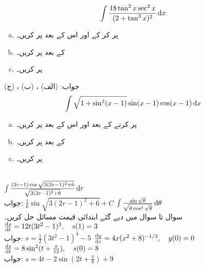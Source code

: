 \begin{align*}
\int\frac{18\tan^2x\sec^2x}{(2+\tan^3x)^2}\dif x
\end{align*}
\begin{enumerate}[a.]
\item
{} پر کر کے   اور اس کے بعد  پر کریں۔
\item
{} کے بعد  پر کریں۔
\item
{} پر کریں۔
\end{enumerate}
جواب:\quad
(الف) ، (ب) ، (ج) 
\begin{align*}
\int\sqrt{1+\sin^2(x-1)}\sin(x-1)\cos(x-1)\dif x
\end{align*}
\begin{enumerate}[a.]
\item
{} پر کرنے کے بعد  اور اس کے بعد  پر کریں۔
\item
{} کے بعد  پر کریں۔
\item
{} پر کریں۔
\end{enumerate}
\\
$\int\tfrac{(2r-1)\cos\sqrt{3(2r-1)^2+6}}{\sqrt{3(2r-1)^2+6}}\dif r$\\
جواب:\quad
$\tfrac{1}{6}\sin\sqrt{3(2r-1)^2+6}+C$
$\int\tfrac{\sin\sqrt{\theta}}{\sqrt{\theta\cos^3\sqrt{\theta}}}\dif\theta$
\\
سوال  تا سوال  میں دیے گئے ابتدائی قیمت مسائل حل کریں۔\\
$\tfrac{\dif s}{\dif t}=12t(3t^2-1)^3,\quad s(1)=3$\\
جواب:\quad
$s=\tfrac{1}{2}(3t^2-1)^4-5$
$\tfrac{\dif y}{\dif x}=4x(x^2+8)^{-1/3},\quad y(0)=0$
$\tfrac{\dif s}{\dif t}=8\sin^2(t+\tfrac{\pi}{12}),\quad s(0)=8$\\
جواب:\quad
$s=4t-2\sin(2t+\tfrac{\pi}{6})+9$
